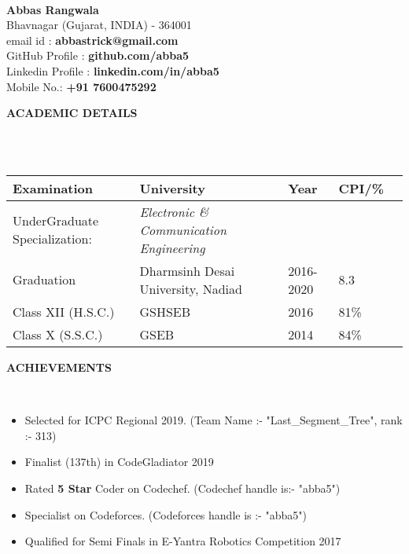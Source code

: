 \documentclass[a4paper,10pt]{article}
\newcommand{\isep}{-2 pt}
\newcommand{\lsep}{-0.5cm}
\newcommand{\resheading}[1]{{\small \colorbox{mygrey}{\begin{minipage}{0.975\textwidth}{\textbf{#1 \vphantom{p\^{E}}}}\end{minipage}}}}
\begin{document}
\hspace{0.5cm}\\[-0.2cm]

\textbf{\Large{Abbas Rangwala}} \\
\indent Bhavnagar (Gujarat, INDIA) - 364001\\
\indent email id : \textbf{abbastrick@gmail.com} \\
\indent GitHub Profile : \textbf{github.com/abba5} \\
\indent Linkedin Profile : \textbf{linkedin.com/in/abba5} \\
\indent Mobile No.: \textbf{+91 7600475292} \\

\resheading{\textbf{ACADEMIC DETAILS} }\\[\lsep]
\\
\begin{center}
\indent \begin{tabular}{ l @{\hskip 0.15in} l @{\hskip 0.15in} l @{\hskip 0.15in} l @{\hskip 0.15in} l }
\hline
\textbf{Examination} & \textbf{University} & \textbf{Year} & \textbf{CPI/\%} \\
\hline
UnderGraduate Specialization: & \textit{Electronic \& Communication Engineering} \\
Graduation & Dharmsinh Desai University, Nadiad  & 2016-2020  & 8.3\\
Class XII (H.S.C.) & GSHSEB & 2016 & 81\% \\
Class X (S.S.C.) & GSEB & 2014 & 84\% \\ 
\hline
\end{tabular}
\end{center}

\resheading{\textbf{ACHIEVEMENTS} }\\[\lsep]
\begin{itemize}\itemsep \isep
\item \noindent Selected for ICPC Regional 2019. (Team Name :- "Last\_Segment\_Tree", rank :- 313)
\item \noindent  Finalist (137th) in CodeGladiator 2019
\item \noindent Rated \textbf{5 Star} Coder on Codechef. (Codechef handle is:- "abba5")
\item \noindent Specialist on Codeforces. (Codeforces handle is :- "abba5")
\item \noindent  Qualified for Semi Finals in E-Yantra Robotics Competition 2017
\end{itemize}
\end{document}
